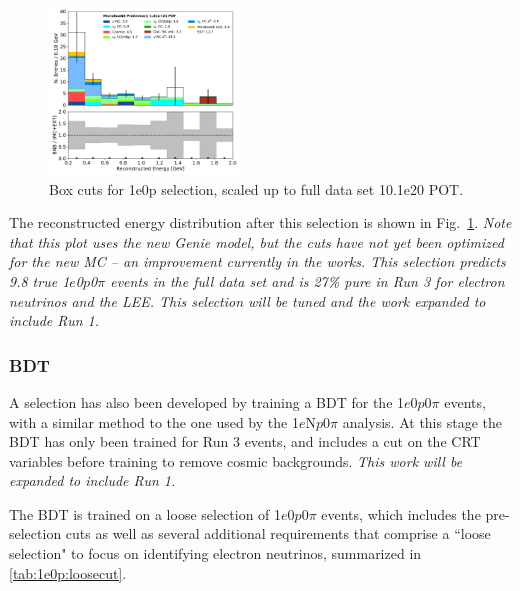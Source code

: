 \documentclass[a4paper]{article}
\newcommand{\npsel}{1$e$N$p$0$\pi$ }
\newcommand{\zpsel}{1$e$0$p$0$\pi$ }
\begin{document}

\begin{figure}[H]
\begin{center}
\includegraphics[width=0.45\textwidth]{1e0p/reco_e_01162020_RUN3.pdf}
\caption{\label{fig:1e0p:cutbased:RUN3} Box cuts for 1e0p selection, scaled up to full data set 10.1e20 POT.}
\end{center}
\end{figure}

The reconstructed energy distribution after this selection is shown in Fig.~\ref{fig:1e0p:cutbased:RUN3}.  \emph{Note that this plot uses the new Genie model, but the cuts have not yet been optimized for the new MC -- an improvement currently in the works.  This selection predicts 9.8 true \zpsel events in the full data set and is 27\% pure in Run 3 for electron neutrinos and the LEE.  This selection will be tuned and the work expanded to include Run 1.}

\subsubsection{BDT}

A selection has also been developed by training a BDT for the \zpsel events, with a similar method to the one used by the \npsel analysis.  At this stage the BDT has only been trained for Run 3 events, and includes a cut on the CRT variables before training to remove cosmic backgrounds.  \emph{This work will be expanded to include Run 1.}

The BDT is trained on a loose selection of \zpsel events, which includes the pre-selection cuts as well as several additional requirements that comprise a ``loose selection" to focus on identifying electron neutrinos, summarized in \ref{tab:1e0p:loosecut}.
\end{document}
